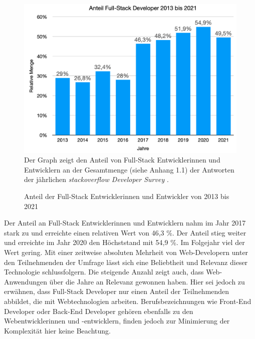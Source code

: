 \documentclass[a4paper]{scrartcl}
\begin{document}
\begin{figure}[H]
	\centering
		\caption{Anteil der Full-Stack Entwicklerinnen und Entwickler von 2013 bis 2021}
	\includegraphics[scale=0.28]{_assets/stackoverflow_fullstack_developers.png} \\
	Der Graph zeigt den Anteil von Full-Stack Entwicklerinnen und Entwicklern an der Gesamtmenge (siehe Anhang 1.1) der Antworten der jährlichen \textit{stackoverflow Developer Survey} \autocite{stackoverflow_2015,stackoverflow_2016,stackoverflow_2017,stackoverflow_2018,stackoverflow_2019,stackoverflow_2020,stackoverflow_2021}.  
\end{figure}

Der Anteil an Full-Stack Entwicklerinnen und Entwicklern nahm im Jahr 2017 stark zu und erreichte einen relativen Wert von 46,3 \%. Der Anteil stieg weiter und erreichte im Jahr 2020 den Höchststand mit 54,9 \%. Im Folgejahr viel der Wert gering. Mit einer zeitweise absoluten Mehrheit von Web-Developern unter den Teilnehmenden der Umfrage lässt sich eine Beliebtheit und Relevanz dieser Technologie schlussfolgern. Die steigende Anzahl zeigt auch, dass Web-Anwendungen über die Jahre an Relevanz gewonnen haben. Hier sei jedoch zu erwähnen, dass Full-Stack Developer nur einen Anteil der Teilnehmenden abbildet, die mit Webtechnologien arbeiten. Berufsbezeichnungen wie Front-End Developer oder Back-End Developer gehören ebenfalls zu den Webentwicklerinnen und -entwicklern, finden jedoch zur Minimierung der Komplexität hier keine Beachtung. \\ 
\end{document}
